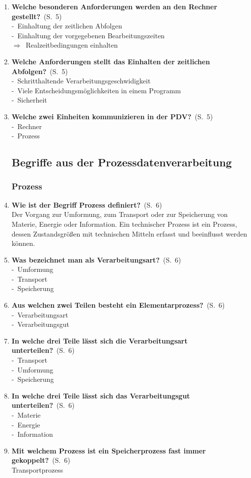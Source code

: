 \documentclass[a4paper,12pt]{article}
\newcommand{\question}[3]{\pagebreak[3]\item {\textbf{#1?}}\ (S.\ #2)#3}
\newcommand{\catchword}[1]{\\-\ #1}
\newcommand{\normaltext}[1]{\\#1}
\newcommand{\result}[1]{\\$\Rightarrow$\ #1}
\newcommand{\page}[1]{#1}
\begin{document}
\begin{enumerate}
  \question{Welche besonderen Anforderungen werden an den Rechner gestellt}{\page{5}}
  {
    \catchword{Einhaltung der zeitlichen Abfolgen}
    \catchword{Einhaltung der vorgegebenen Bearbeitungszeiten}
    \result{Realzeitbedingungen einhalten}
  }

  \question{Welche Anforderungen stellt das Einhalten der zeitlichen Abfolgen}{\page{5}}
  {
    \catchword{Schritthaltende Verarbeitungsgeschwidigkeit}
    \catchword{Viele Entscheidungsmöglichkeiten in einem Programm}
    \catchword{Sicherheit}
  }

  \question{Welche zwei Einheiten kommunizieren in der PDV}{\page{5}}
  {
    \catchword{Rechner}
    \catchword{Prozess}
  }

  \subsection{Begriffe aus der Prozessdatenverarbeitung}

  \subsubsection{Prozess}

  \question{Wie ist der Begriff Prozess definiert}{\page{6}}
  {
    \normaltext{Der Vorgang zur Umformung, zum Transport oder zur Speicherung von Materie, 
                Energie oder Information. Ein technischer Prozess ist ein Prozess, dessen
                Zustandsgrößen mit technischen Mitteln erfasst und beeinflusst werden können.}
  }

  \question{Was bezeichnet man als Verarbeitungsart}{\page{6}}
  {
    \catchword{Umformung}
    \catchword{Transport}
    \catchword{Speicherung}
  }

  \question{Aus welchen zwei Teilen besteht ein Elementarprozess}{\page{6}}
  {
    \catchword{Verarbeitungsart}
    \catchword{Verarbeitungsgut}
  }

  \question{In welche drei Teile lässt sich die Verarbeitungsart unterteilen}{\page{6}}
  {
    \catchword{Transport}
    \catchword{Umformung}
    \catchword{Speicherung}
  }

  \question{In welche drei Teile lässt sich das Verarbeitungsgut unterteilen}{\page{6}}
  {
    \catchword{Materie}
    \catchword{Energie}
    \catchword{Information}
  }

  \question{Mit welchem Prozess ist ein Speicherprozess fast immer gekoppelt}{\page{6}}
  {
    \normaltext{Transportprozess}
  }


\end{enumerate}
\end{document}
